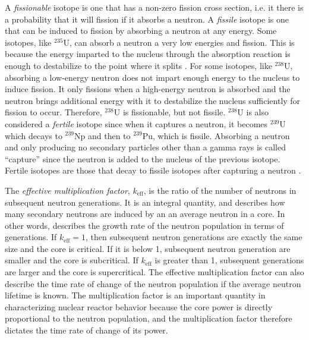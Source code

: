 A \emph{fissionable} isotope is one that has a non-zero fission cross section, i.e. it there is a probability that it will fission if it absorbs a neutron.  A \emph{fissile} isotope is one that can be induced to fission by absorbing a neutron at any energy.  Some isotopes, like $^{235}$U, can absorb a neutron a very low energies and fission.  This is because the energy imparted to the nucleus through the absorption reaction is enough to destabilize to the point where it splits \cite{duderstadt}.  For some isotopes, like $^{238}$U, absorbing a low-energy neutron does not impart enough energy to the nucleus to induce fission.  It only fissions when a high-energy neutron is absorbed and the neutron brings additional energy with it to destabilize the nucleus sufficiently for fission to occur.  Therefore, $^{238}$U is fissionable, but not fissile.  $^{238}$U is also considered a \emph{fertile} isotope since when it captures a neutron, it becomes $^{239}$U which decays to $^{239}$Np and then to $^{239}$Pu, which is fissile.  Absorbing a neutron and only producing no secondary particles other than a gamma rays is called ``capture'' since the neutron is added to the nucleus of the previous isotope.  Fertile isotopes are those that decay to fissile isotopes after capturing a neutron \cite{duderstadt}.

The \emph{effective multiplication factor}, $k_\mathrm{eff}$, is the ratio of the number of neutrons in subsequent neutron generations. It is an integral quantity, and describes how many secondary neutrons are induced by an an average neutron in a core.  In other words, describes the growth rate of the neutron population in terms of generations.  If $k_\mathrm{eff}=1$, then subsequent neutron generations are exactly the same size and the core is critical.  If it is below 1, subsequent neutron generation are smaller and the core is subcritical.  If $k_\mathrm{eff}$ is greater than 1, subsequent generations are larger and the core is supercritical.  The effective multiplication factor can also describe the time rate of change of the neutron population if the average neutron lifetime is known.  The multiplication factor is an important quantity in characterizing nuclear reactor behavior because the core power is directly proportional to the neutron population, and the multiplication factor therefore dictates the time rate of change of its power.

